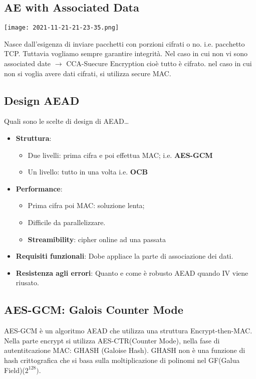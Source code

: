 \documentclass{article}
\theoremstyle{remark}
\begin{document}
\subsection{AE with Associated Data}
\begin{center}
	\texttt{[image: 2021-11-21-21-23-35.png]}
\end{center}
Nasce dall'esigenza di inviare pacchetti con porzioni cifrati o no. i.e. pacchetto TCP. Tuttavia vogliamo sempre garantire
integrità.\newline
Nel caso in cui non vi sono associated date $\rightarrow$ CCA-Suecure Encryption cioè tutto è cifrato. nel caso in cui non si
voglia avere dati cifrati, si utilizza secure MAC.
\subsection{Design AEAD}
Quali sono le scelte di design di AEAD\dots
\begin{itemize}
	\item \textbf{Struttura}: \begin{itemize}
		      \item Due livelli: prima cifra e poi effettua MAC; i.e. \textbf{AES-GCM}
		      \item Un livello: tutto in una volta i.e. \textbf{OCB}
	      \end{itemize}
	\item \textbf{Performance}: \begin{itemize}
		      \item Prima cifra poi MAC: soluzione lenta;
		      \item Difficile da parallelizzare.
		      \item \textbf{Streamibility}: cipher online ad una passata
	      \end{itemize}
	\item \textbf{Requisiti funzionali}: Dobe appliace la parte di associazione dei dati.
	\item \textbf{Resistenza agli errori}: Quanto e come è robusto AEAD quando IV viene riusato.
\end{itemize}
\subsection{AES-GCM: Galois Counter Mode}
AES-GCM è un algoritmo AEAD che utilizza una struttura Encrypt-then-MAC. Nella parte encrypt si utilizza AES-CTR(Counter Mode),
nella fase di autentitcazione MAC: GHASH (Galoise Hash). GHASH non è una funzione di hash crittografica che si basa sulla moltiplicazione
di polinomi nel GF(Galua Field)($2^{128})$.\newline
\end{document}
